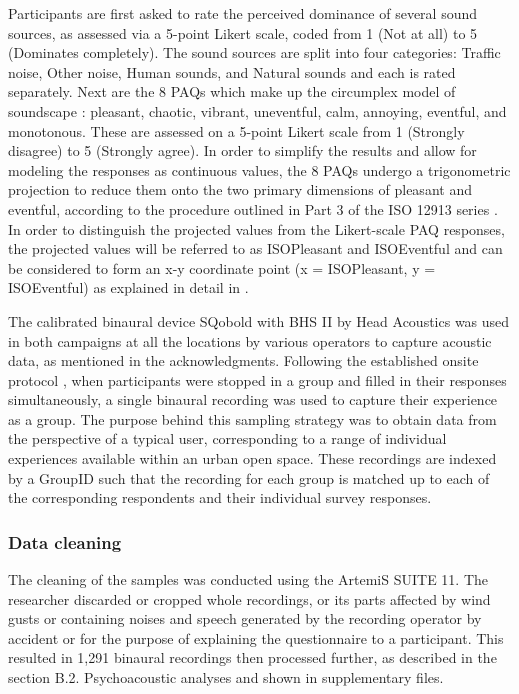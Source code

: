 Participants are first asked to rate the perceived dominance of several sound sources, as assessed via a 5-point Likert scale, coded from 1 (Not at all) to 5 (Dominates completely). The sound sources are split into four categories: Traffic noise, Other noise, Human sounds, and Natural sounds and each is rated separately. Next are the 8 PAQs which make up the circumplex model of soundscape \citep{axelsson_principal_2010}: pleasant, chaotic, vibrant, uneventful, calm, annoying, eventful, and monotonous. These are assessed on a 5-point Likert scale from 1 (Strongly disagree) to 5 (Strongly agree). In order to simplify the results and allow for modeling the responses as continuous values, the 8 PAQs undergo a trigonometric projection to reduce them onto the two primary dimensions of pleasant and eventful, according to the procedure outlined in Part 3 of the ISO 12913 series \citep{international_organisation_for_standardization_isots_2019}. In order to distinguish the projected values from the Likert-scale PAQ responses, the projected values will be referred to as ISOPleasant and ISOEventful and can be considered to form an x-y coordinate point (x = ISOPleasant, y = ISOEventful) as explained in detail in \citet{lionello_introducing_2021}.

The calibrated binaural device SQobold with BHS II by Head Acoustics was used in both campaigns at all the locations by various operators to capture acoustic data, as mentioned in the acknowledgments. Following the established onsite protocol \citep{mitchell_soundscape_2020}, when participants were stopped in a group and filled in their responses simultaneously, a single binaural recording was used to capture their experience as a group. The purpose behind this sampling strategy was to obtain data from the perspective of a typical user, corresponding to a range of individual experiences available within an urban open space. These recordings are indexed by a GroupID such that the recording for each group is matched up to each of the corresponding respondents and their individual survey responses.

\subsubsection{Data cleaning}

The cleaning of the samples was conducted using the ArtemiS SUITE 11. The researcher discarded or cropped whole recordings, or its parts affected by wind gusts or containing noises and speech generated by the recording operator by accident or for the purpose of explaining the questionnaire to a participant. This resulted in 1,291 binaural recordings then processed further, as described in the section B.2. Psychoacoustic analyses and shown in supplementary files.

